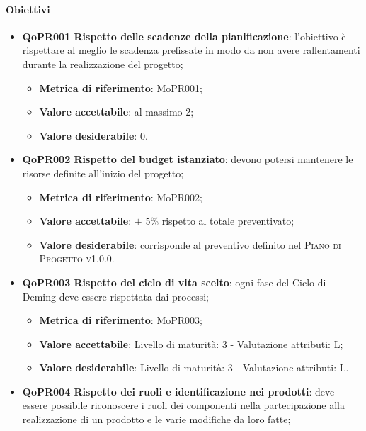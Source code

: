 \documentclass[../piano-di-qualifica.tex]{subfiles}
\begin{document}
\paragraph{Obiettivi}
\label{sub:obiettivi_1}
\begin{itemize}
    \item \textbf{QoPR001 Rispetto delle scadenze della pianificazione}: l'obiettivo è rispettare al meglio le scadenza prefissate in modo da non avere rallentamenti durante la realizzazione del progetto;
        \begin{itemize}
            \item \textbf{Metrica di riferimento}: MoPR001;
            \item \textbf{Valore accettabile}: al massimo 2; %
            \item \textbf{Valore desiderabile}: 0.
        \end{itemize}
    \item \textbf{QoPR002 Rispetto del budget istanziato}: devono potersi mantenere le risorse definite all'inizio del progetto;
        \begin{itemize}
            \item \textbf{Metrica di riferimento}: MoPR002;
            \item \textbf{Valore accettabile}: $\pm$ 5\% rispetto al totale preventivato; %
            \item \textbf{Valore desiderabile}: corrisponde al preventivo definito nel \textsc{Piano di Progetto v1.0.0}.
        \end{itemize}
    \item \textbf{QoPR003 Rispetto del ciclo di vita scelto}: ogni fase del Ciclo di Deming deve essere rispettata dai processi;
        \begin{itemize}
            \item \textbf{Metrica di riferimento}: MoPR003;
            \item \textbf{Valore accettabile}: Livello di maturità: 3 - Valutazione attributi: L; %
            \item \textbf{Valore desiderabile}: Livello di maturità: 3 - Valutazione attributi: L.
        \end{itemize}
    \item \textbf{QoPR004 Rispetto dei ruoli e identificazione nei prodotti}: deve essere possibile riconoscere i ruoli dei componenti nella partecipazione alla realizzazione di un prodotto e le varie modifiche da loro fatte;

\end{itemize}
\end{document}
